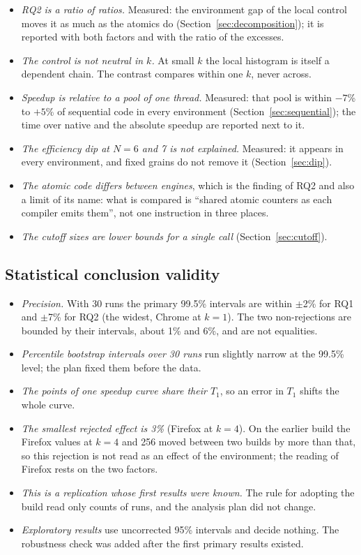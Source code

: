 \begin{itemize}[leftmargin=1.5em]
\item \emph{RQ2 is a ratio of ratios.} Measured: the environment gap of the
local control moves it as much as the atomics do
(Section~\ref{sec:decomposition}); it is reported with both factors and
with the ratio of the excesses.
\item \emph{The control is not neutral in $k$.} At small $k$ the local
histogram is itself a dependent chain. The contrast compares within one
$k$, never across.
\item \emph{Speedup is relative to a pool of one thread.} Measured: that
pool is within $-7$\% to $+5$\% of sequential code in every environment
(Section~\ref{sec:sequential}); the time over native and the absolute
speedup are reported next to it.
\item \emph{The efficiency dip at $N=6$ and 7 is not explained.} Measured:
it appears in every environment, and fixed grains do not remove it
(Section~\ref{sec:dip}).
\item \emph{The atomic code differs between engines}, which is the finding
of RQ2 and also a limit of its name: what is compared is ``shared atomic
counters as each compiler emits them'', not one instruction in three places.
\item \emph{The cutoff sizes are lower bounds for a single call}
(Section~\ref{sec:cutoff}).
\end{itemize}

\subsection{Statistical conclusion validity}

\begin{itemize}[leftmargin=1.5em]
\item \emph{Precision.} With 30 runs the primary 99.5\% intervals are
within $\pm$2\% for RQ1 and $\pm$7\% for RQ2 (the widest, Chrome at $k=1$).
The two non-rejections are bounded by their intervals, about 1\% and 6\%,
and are not equalities.
\item \emph{Percentile bootstrap intervals over 30 runs} run slightly
narrow at the 99.5\% level; the plan fixed them before the data.
\item \emph{The points of one speedup curve share their $T_1$}, so an error
in $T_1$ shifts the whole curve.
\item \emph{The smallest rejected effect is 3\%} (Firefox at $k=4$). On the
earlier build the Firefox values at $k=4$ and 256 moved between two builds
by more than that, so this rejection is not read as an effect of the
environment; the reading of Firefox rests on the two factors.
\item \emph{This is a replication whose first results were known.} The
rule for adopting the build read only counts of runs, and the analysis
plan did not change.
\item \emph{Exploratory results} use uncorrected 95\% intervals and decide
nothing. The robustness check was added after the first primary results
existed.
\end{itemize}


